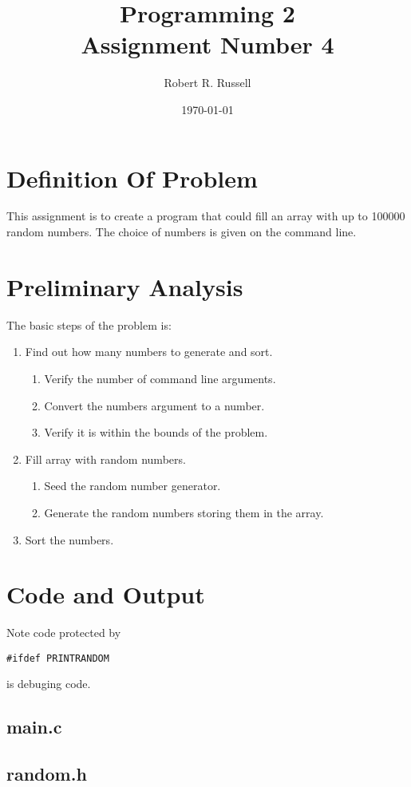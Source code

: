 \documentclass[letterpaper,oneside]{scrartcl}
\title{Programming 2\\Assignment Number 4}
\author{Robert R. Russell}
\date{\today}
\begin{document}
\maketitle

\section{Definition Of Problem}
This assignment is to create a program that could fill an array with up to 100000 random numbers.
The choice of numbers is given on the command line.
\section{Preliminary Analysis}
The basic steps of the problem is:
\begin{enumerate}
\item Find out how many numbers to generate and sort.
  \begin{enumerate}
  \item Verify the number of command line arguments.
  \item Convert the numbers argument to a number.
  \item Verify it is within the bounds of the problem.
  \end{enumerate}
\item Fill array with random numbers.
  \begin{enumerate}
  \item Seed the random number generator.
  \item Generate the random numbers storing them in the array.
  \end{enumerate}
\item Sort the numbers.
\end{enumerate}

\section{Code and Output}

Note code protected by
\begin{verbatim}
#ifdef PRINTRANDOM
\end{verbatim}
is debuging code.

\subsection{main.c}

\subsection{random.h}
\end{document}
